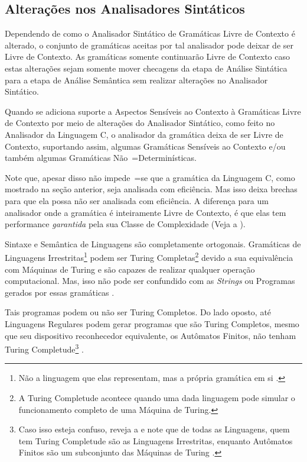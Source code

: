 \subsection{Alterações nos Analisadores Sintáticos}
\label{alteracoesNosAnalisadoresSintaticos}

Dependendo de como o Analisador Sintático de Gramáticas Livre de Contexto é alterado,
o conjunto de gramáticas aceitas por tal analisador pode deixar de ser Livre de Contexto.
As gramáticas somente continuarão Livre de Contexto caso estas alterações sejam somente mover checagens da etapa de Análise Sintática para a etapa de Análise Semântica sem realizar alterações no Analisador Sintático.

Quando se adiciona suporte a Aspectos Sensíveis ao Contexto \cite{contextSensitiveParsing} à Gramáticas Livre de Contexto por meio de alterações do Analisador Sintático,
como feito no Analisador da Linguagem C,
o analisador da gramática deixa de ser Livre de Contexto,
suportando assim,
algumas Gramáticas Sensíveis ao Contexto e\slash{}ou também algumas Gramáticas Não~=Determinísticas.

Note que,
apesar disso não impede~=se que a gramática da Linguagem C,
como mostrado na seção anterior,
seja analisada com eficiência.
Mas isso deixa brechas para que ela possa não ser analisada com eficiência.
A diferença para um analisador onde a gramática é inteiramente Livre de Contexto,
é que elas tem performance \textit{garantida} pela sua Classe de Complexidade (Veja a ).

Sintaxe e
Semântica de Linguagens são completamente ortogonais.
Gramáticas de Linguagens Irrestritas\footnote{
Não a linguagem que elas representam,
mas a própria gramática em si \cite{finiteAutomataTuringComplete}.
}
podem ser Turing Completas\footnote{
A Turing Completude acontece quando uma dada linguagem pode simular o funcionamento completo de uma Máquina de Turing.
}
devido a sua equivalência com Máquinas de Turing e
são capazes de realizar qualquer operação computacional.
Mas,
isso não pode ser confundido com as \textit{Strings} ou
Programas gerados por essas gramáticas \cite{areThereDomainSpecificLanguages}.

Tais programas podem ou
não ser Turing Completos.
Do lado oposto,
até Linguagens Regulares podem gerar programas que são Turing Completos,
mesmo que seu dispositivo reconhecedor equivalente,
os Autômatos Finitos,
não tenham Turing Completude\footnote{
Caso isso esteja confuso,
reveja a  e
note que de todas as Linguagens,
quem tem Turing Completude são as Linguagens Irrestritas,
enquanto Autômatos Finitos são um subconjunto das Máquinas de Turing \cite{finiteAutomataTuringComplete}.
}
\cite{turingCompleteRegularLanguages,finiteAutomataTuringComplete}.



